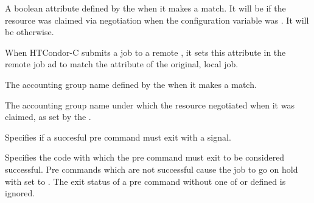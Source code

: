 \begin{description}
\item[\AdAttr{SubmitterAutoregroup}:]  A boolean attribute defined
by the  when it makes a match. 
It will be  if the resource was claimed via negotiation
when the configuration variable  was .
It will be  otherwise.

\item[\AdAttr{SubmitterGlobalJobId}:]
When HTCondor-C submits a job to a remote , it sets this
attribute in the remote job ad to match the  attribute
of the original, local job.

\item[\AdAttr{SubmitterGroup}:]  The accounting group name defined
by the  when it makes a match. 

\item[\AdAttr{SubmitterNegotiatingGroup}:]  The accounting group name under
which the resource negotiated when it was claimed, 
as set by the . 

\item[\AdAttr{SuccessPreExitBySignal}:] Specifies if a succesful pre command
must exit with a signal.

\item[\AdAttr{SuccessPreExitCode}:] Specifies the code with which the pre
command must exit to be considered successful. Pre commands which are
not successful cause the job to go on hold with  set to
. The exit status of a pre command without one of
 or  defined is
ignored.


\end{description}
